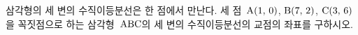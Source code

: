 삼각형의 세 변의 수직이등분선은 한 점에서 만난다. 세 점~$\mathrm{A}(1,\,0)$, $\mathrm{B}(7,\,2)$, $\mathrm{C}(3,\,6)$을 꼭짓점으로 하는 삼각형~$\mathrm{ABC}$의 세 변의 수직이등분선의 교점의 좌표를 구하시오.
